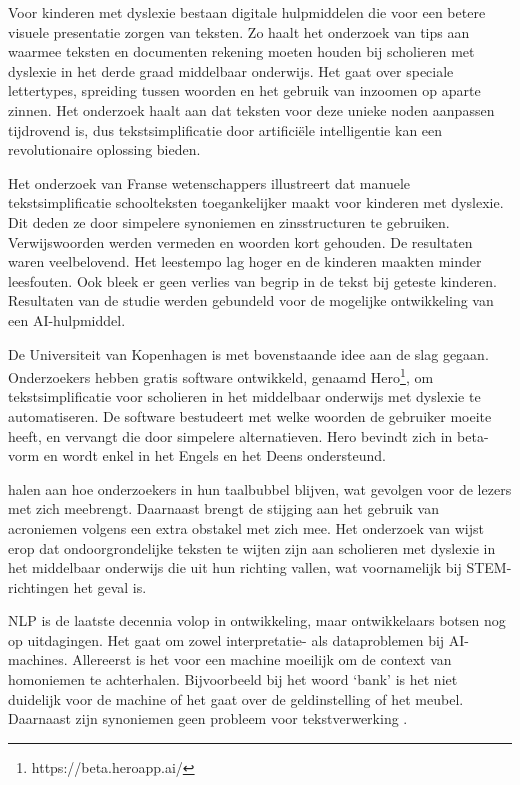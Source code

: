 Voor kinderen met dyslexie bestaan digitale hulpmiddelen die voor een betere visuele presentatie zorgen van teksten. Zo haalt het onderzoek van \textcite{Rello2012} tips aan waarmee teksten en documenten rekening moeten houden bij scholieren met dyslexie in het derde graad middelbaar onderwijs. Het gaat over speciale lettertypes, spreiding tussen woorden en het gebruik van inzoomen op aparte zinnen. Het onderzoek haalt aan dat teksten voor deze unieke noden aanpassen tijdrovend is, dus tekstsimplificatie door artificiële intelligentie kan een revolutionaire oplossing bieden. 

Het onderzoek van Franse wetenschappers \newline \textcite{Gala2016} illustreert dat manuele tekstsimplificatie schoolteksten toegankelijker maakt voor kinderen met dyslexie. Dit deden ze door simpelere synoniemen en zinsstructuren te gebruiken. Verwijswoorden werden vermeden en woorden kort gehouden. De resultaten waren veelbelovend. Het leestempo lag hoger en de kinderen maakten minder leesfouten. Ook bleek er geen verlies van begrip in de tekst bij geteste kinderen. Resultaten van de studie werden gebundeld voor de mogelijke ontwikkeling van een AI-hulpmiddel.

De Universiteit van Kopenhagen is met bovenstaande idee aan de slag gegaan. Onderzoekers \textcite{Bingel2018} hebben gratis software ontwikkeld, genaamd Hero\footnote{https://beta.heroapp.ai/}, om tekstsimplificatie voor scholieren in het middelbaar onderwijs met dyslexie te automatiseren. De software bestudeert met welke woorden de gebruiker moeite heeft, en vervangt die door simpelere alternatieven. Hero bevindt zich in beta-vorm en wordt enkel in het Engels en het Deens ondersteund. 

\textcite{PlavenSigray2017} halen aan hoe onderzoekers in hun taalbubbel blijven, wat gevolgen voor de lezers met zich meebrengt. Daarnaast brengt de stijging aan het gebruik van acroniemen volgens \textcite{Barnett2020} een extra obstakel met zich mee. Het onderzoek van \textcite{Donato2022} wijst erop dat ondoorgrondelijke teksten te wijten zijn aan scholieren met dyslexie in het middelbaar onderwijs die uit hun richting vallen, wat voornamelijk bij STEM-richtingen het geval is. 

NLP is de laatste decennia volop in ontwikkeling, maar ontwikkelaars botsen nog op uitdagingen. Het gaat om zowel interpretatie- als dataproblemen bij AI-machines. Allereerst is het voor een machine moeilijk om de context van homoniemen te achterhalen. Bijvoorbeeld bij het woord ‘bank’ is het niet duidelijk voor de machine of het gaat over de geldinstelling of het meubel. Daarnaast zijn synoniemen geen probleem voor tekstverwerking \autocite{Roldos2020}.

